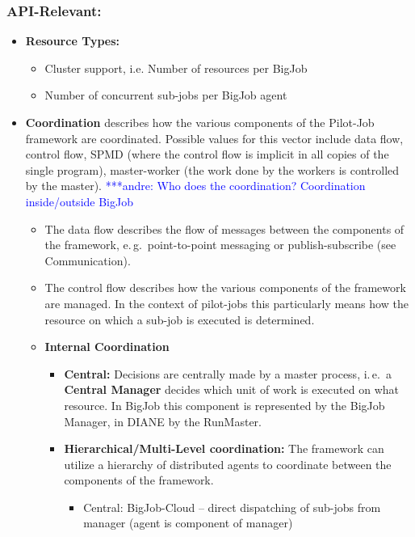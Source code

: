 \documentclass[]{article}
\newcommand{\alnote}[1]{ {\textcolor{blue} { ***andre: #1 }}}
\newcommand{\alnote}[1]{}
\begin{document}
\subsubsection{API-Relevant:}
\begin{itemize}

	\item \textbf{Resource Types:} 
	\begin{itemize}
		\item Cluster support, i.e. Number of resources per BigJob
		\item Number of concurrent sub-jobs per BigJob agent
	\end{itemize}
	\item \textbf{Coordination} describes how the various components of 
	the Pilot-Job framework are coordinated. Possible values for this vector 
	include data flow, control flow, SPMD (where the control flow is implicit in 
	all copies of the single program), master-worker (the work done by the 
	workers is controlled by the master). \alnote{Who does the coordination? Coordination inside/outside BigJob}
	\begin{itemize}
		\item The data flow describes the flow of messages between the 
		components of the framework, e.\,g.\ point-to-point messaging or 
		publish-subscribe (see Communication).
		\item The control flow describes how the various components of the
		 framework are managed. In the context of pilot-jobs this particularly 
		 means how the resource on which a sub-job is executed is determined. 
		 \item \textbf{Internal Coordination}
			\begin{itemize}
				\item \textbf{Central:} Decisions are centrally made by a master
				 process, i.\,e.\ a \textbf{Central Manager} decides which unit 
				 of work  is executed on what resource. In BigJob 
     			 this component is  represented by the BigJob Manager, in DIANE 
     			 by the RunMaster.
     			 \item \textbf{Hierarchical/Multi-Level coordination:} The 
     			 framework can  utilize a hierarchy of distributed agents to 
     			 coordinate between the components of the framework. 
                 \begin{itemize}
                 	    \item Central: BigJob-Cloud -- direct dispatching of 
                 	    sub-jobs from manager (agent is component of manager)

\end{itemize}
\end{itemize}
\end{itemize}
\end{itemize}
\end{document}
